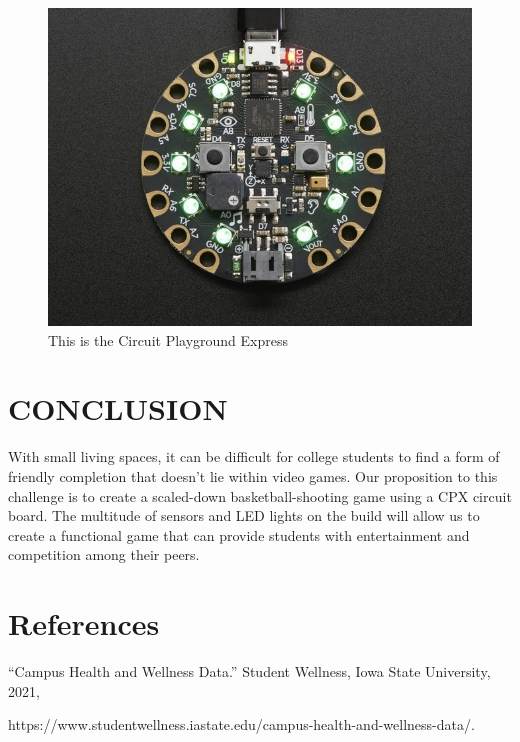 \documentclass[12pt]{article}
\begin{document}
  \begin{figure}[!t]
\centering
\includegraphics[width=4.5in]{cpx01.jpg}
\caption{This is the Circuit Playground Express}
\label{fig:cpx}
\end{figure}

\section{CONCLUSION}
With small living spaces, it can be difficult for college students to find a form of friendly completion that doesn't lie within video games. Our proposition to this challenge is to create a scaled-down basketball-shooting game using a CPX circuit board. The multitude of sensors and LED lights on the build will allow us to create a functional game that can provide students with entertainment and competition among their peers.

\newpage
\section{References}
\printbibliography[heading=subbibintoc]
%
%
“Campus Health and Wellness Data.” Student Wellness, Iowa State University, 2021,

https://www.studentwellness.iastate.edu/campus-health-and-wellness-data/. 
\end{document}
